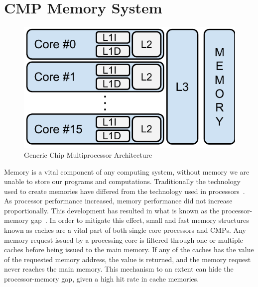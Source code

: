 \section{CMP Memory System}

\begin{figure}[ht]
\centering
\includegraphics[scale=.65]{figures/processor_model/processor_model}
\caption{Generic Chip Multiprocessor Architecture}
\label{fig:cmp_model}
\end{figure}

Memory is a vital component of any computing system, without memory we are unable to store our programs and computations.
Traditionally the technology used to create memories have differed from the technology used in processors~\cite{Wilkes2001}.
As processor performance increased, memory performance did not increase proportionally.
This development has resulted in what is known as the processor-memory gap~\cite{Wilkes2001}.
In order to mitigate this effect, small and fast memory structures known as caches are a vital part of both single core processors and CMPs.
Any memory request issued by a processing core is filtered through one or multiple caches before being issued to the main memory.
If any of the caches has the value of the requested memory address, the value is returned, and the memory request never reaches the main memory.
This mechanism to an extent can hide the processor-memory gap, given a high hit rate in cache memories.

